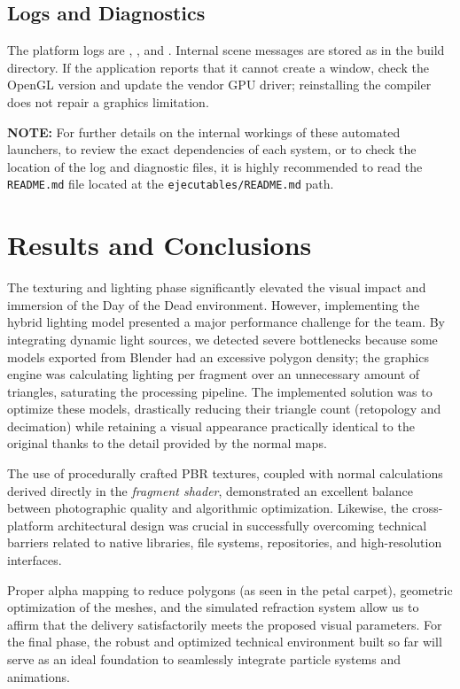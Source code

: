 \documentclass[letter,11pt]{article}
\begin{document}
	\subsection{Logs and Diagnostics}
	The platform logs are , , and . Internal scene messages are stored as  in the build directory. If the application reports that it cannot create a window, check the OpenGL version and update the vendor GPU driver; reinstalling the compiler does not repair a graphics limitation.
	
	\vspace{0.4cm}
	\textbf{NOTE:} For further details on the internal workings of these automated launchers, to review the exact dependencies of each system, or to check the location of the log and diagnostic files, it is highly recommended to read the \texttt{README.md} file located at the \texttt{ejecutables/README.md} path.
	
	\section{Results and Conclusions}
	The texturing and lighting phase significantly elevated the visual impact and immersion of the Day of the Dead environment. However, implementing the hybrid lighting model presented a major performance challenge for the team. By integrating dynamic light sources, we detected severe bottlenecks because some models exported from Blender had an excessive polygon density; the graphics engine was calculating lighting per fragment over an unnecessary amount of triangles, saturating the processing pipeline. The implemented solution was to optimize these models, drastically reducing their triangle count (retopology and decimation) while retaining a visual appearance practically identical to the original thanks to the detail provided by the normal maps.
	
	The use of procedurally crafted PBR textures, coupled with normal calculations derived directly in the \textit{fragment shader}, demonstrated an excellent balance between photographic quality and algorithmic optimization. Likewise, the cross-platform architectural design was crucial in successfully overcoming technical barriers related to native libraries, file systems, repositories, and high-resolution interfaces.
	
	Proper alpha mapping to reduce polygons (as seen in the petal carpet), geometric optimization of the meshes, and the simulated refraction system allow us to affirm that the delivery satisfactorily meets the proposed visual parameters. For the final phase, the robust and optimized technical environment built so far will serve as an ideal foundation to seamlessly integrate particle systems and animations.
	
\end{document}

